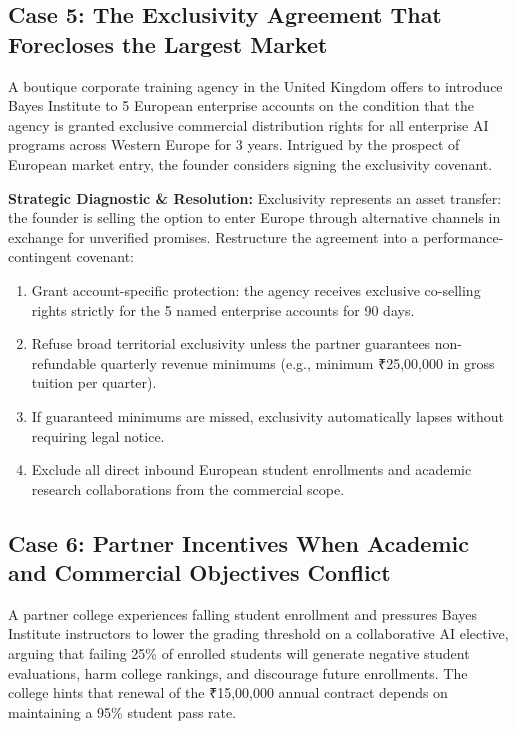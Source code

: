 \subsection{Case 5: The Exclusivity Agreement That Forecloses the Largest Market}
\label{sec:case5_exclusivity_forecloses_market}

A boutique corporate training agency in the United Kingdom offers to introduce Bayes Institute to 5 European enterprise accounts on the condition that the agency is granted exclusive commercial distribution rights for all enterprise AI programs across Western Europe for 3 years. Intrigued by the prospect of European market entry, the founder considers signing the exclusivity covenant.

\textbf{Strategic Diagnostic \& Resolution:} Exclusivity represents an asset transfer: the founder is selling the option to enter Europe through alternative channels in exchange for unverified promises. Restructure the agreement into a performance-contingent covenant:
\begin{enumerate}
\item Grant account-specific protection: the agency receives exclusive co-selling rights strictly for the 5 named enterprise accounts for 90 days.
\item Refuse broad territorial exclusivity unless the partner guarantees non-refundable quarterly revenue minimums (e.g., minimum ₹25,00,000 in gross tuition per quarter).
\item If guaranteed minimums are missed, exclusivity automatically lapses without requiring legal notice.
\item Exclude all direct inbound European student enrollments and academic research collaborations from the commercial scope.
\end{enumerate}

\subsection{Case 6: Partner Incentives When Academic and Commercial Objectives Conflict}
\label{sec:case6_academic_commercial_conflict}

A partner college experiences falling student enrollment and pressures Bayes Institute instructors to lower the grading threshold on a collaborative AI elective, arguing that failing 25\% of enrolled students will generate negative student evaluations, harm college rankings, and discourage future enrollments. The college hints that renewal of the ₹15,00,000 annual contract depends on maintaining a 95\% student pass rate.


